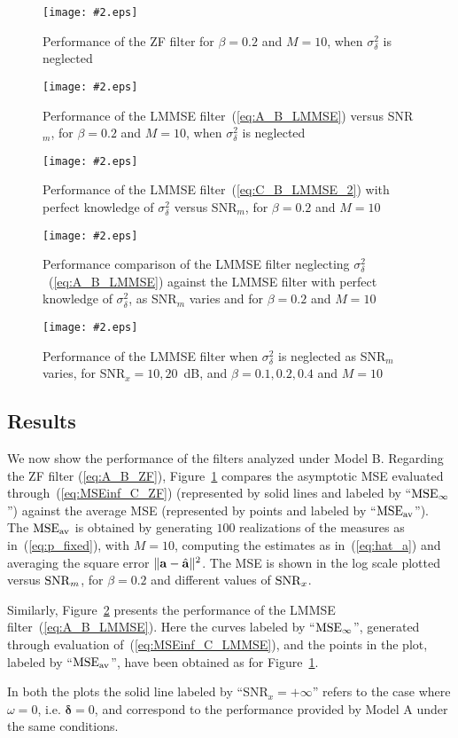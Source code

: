 \documentclass[final, a4paper]{IEEEtran}
\newcommand{\insertfig}[4]{
\begin{figure}[tbh]
\centerline{\texttt{[image: \#2.eps]}}
\vspace{-0.3cm}
\caption{#3}\label{#4}\end{figure}}
\newcommand{\av}{{\bf a}}
\newcommand{\deltav}{\boldsymbol{\delta}}
\def\MSEav{{\rm MSE}_{\rm av}}
\def\MSEinf{{\rm MSE}_{\infty}}
\begin{document}
\insertfig{1.00}{MSE_model_B_0}{Performance of the ZF filter for $\beta=0.2$ and $M=10$, 
when $\sigma^2_\delta$ is neglected}{fig:MSE_model_B_0}
\insertfig{1.00}{MSE_model_B_1}{Performance of the LMMSE filter~(\ref{eq:A_B_LMMSE}) versus SNR$_m$, 
for $\beta=0.2$ and $M=10$, when $\sigma^2_\delta$ is neglected}{fig:MSE_model_B_1}
\insertfig{1.00}{MSE_model_B_2}{Performance of the LMMSE filter~(\ref{eq:C_B_LMMSE_2}) with perfect
knowledge of $\sigma^2_\delta$ versus SNR$_m$, for $\beta=0.2$ and $M=10$}{fig:MSE_model_B_2}
\insertfig{1.00}{MSE_model_B_3}{Performance comparison of the LMMSE filter neglecting
$\sigma^2_\delta$~(\ref{eq:A_B_LMMSE})
against the LMMSE filter with perfect knowledge of $\sigma^2_\delta$, as SNR$_m$ varies and
for $\beta=0.2$ and $M=10$}{fig:MSE_model_B_3}
\insertfig{1.00}{MSE_model_B_4}{Performance of the LMMSE filter when $\sigma^2_\delta$
is neglected as SNR$_m$ varies, for SNR$_x=10,20$~dB, and $\beta=0.1,0.2,0.4$ and $M=10$}{fig:MSE_model_B_4}

\subsection{Results \label{subsec:C_numerical_results}}

We now show the performance of the filters analyzed under Model B.
Regarding the ZF filter (\ref{eq:A_B_ZF}),
Figure~\ref{fig:MSE_model_B_0} compares the asymptotic MSE evaluated
through~(\ref{eq:MSEinf_C_ZF}) (represented by solid lines and
labeled by ``$\MSEinf$'') against the average MSE (represented by
points and labeled by ``$\MSEav$''). The $\MSEav$ is obtained by
generating $100$ realizations of the measures as
in~(\ref{eq:p_fixed}), with $M=10$, computing the estimates as
in~(\ref{eq:hat_a}) and averaging the square error
$\|\av-\hat{\av}\|^2$. The MSE is shown in the log scale plotted
versus ${\rm SNR}_m$, for $\beta=0.2$ and different values of ${\rm
SNR}_x$.

Similarly, Figure~\ref{fig:MSE_model_B_1} presents the performance of the
LMMSE filter~(\ref{eq:A_B_LMMSE}). Here the curves labeled by ``$\MSEinf$'', generated through evaluation of~(\ref{eq:MSEinf_C_LMMSE}),
and the points in the plot, labeled by ``$\MSEav$'', have been obtained as for Figure~\ref{fig:MSE_model_B_0}.

In both the plots the solid line labeled by ``SNR$_x=+\infty$'' refers to the case
where $\omega=0$, i.e. $\deltav=0$, and correspond to the performance provided by Model A under the same conditions.
\end{document}
